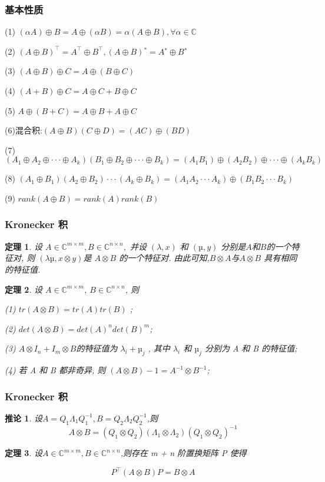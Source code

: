 \documentclass[notheorems,serif]{beamer}
\newcommand{\hei}[1]{{\HEI#1}}
\newtheorem{theorem}{\hei{定理}}
\newtheorem{corollary}{\hei{推论}}
\begin{document}
\begin{frame}
\frametitle{基本性质}
(1) $(αA) \oplus B = A \oplus (αB) = α(A \oplus B), ∀ α ∈ \mathbb{C}$

(2) $(A \oplus B)^{⊺} = A^{⊺} \oplus B^{⊺}, (A \oplus B)^{∗} = A^{∗} \oplus B^{∗}$

(3) $(A \oplus B) \oplus C = A \oplus (B \oplus C)$

(4) $(A + B) \oplus C = A \oplus C + B \oplus C$

(5) $A \oplus (B + C) = A \oplus B + A \oplus C$

(6)混合积:$ (A \oplus B)(C \oplus D) = (AC) \oplus (BD)$

(7) $(A_1 \oplus A_2 \oplus · · · \oplus A_k)(B_1 \oplus B_2 \oplus · · · \oplus B_k)
= (A_1B_1) \oplus (A_2B_2) \oplus · · · \oplus (A_kB_k)$

(8) $(A_1 \oplus B_1)(A_2 \oplus B_2)· · ·(A_k \oplus B_k)
= (A_1A_2 · · · A_k) \oplus (B_1B_2 · · · B_k)$

(9) $rank(A \oplus B) = rank(A)rank(B)$
\end{frame}

\begin{frame}
\frametitle{Kronecker 积}
\begin{theorem}
	设 $A ∈ \mathbb{C}^{m×m}, B ∈ \mathbb{C}^{n×n},$ 并设 $(λ, x)$ 和 $(µ, y)$ 分别是$ A $和$ B $的一个特征对, 则 $(λµ, x ⊗ y) $是 $A ⊗ B$ 的一个特征对. 由此可知,$ B ⊗ A $与$A ⊗ B$ 具有相同的特征值.	
\end{theorem}
\begin{theorem}
	设 $A ∈ \mathbb{C}^{m×m}$, $B ∈ \mathbb{C}^{n×n}$, 则
	
	(1) $tr(A ⊗ B) = tr(A)tr(B)$ ;
	
	(2) $det(A ⊗ B) = det(A)^n det(B)^m $;
	
	(3) $A ⊗ I_n + I_m ⊗ B $的特征值为 $λ_i + µ_j$ , 其中 $λ_i$ 和 $µ_j$ 分别为 A 和 B 的特征值;
	
	(4) 若 A 和 B 都非奇异, 则 $(A ⊗ B)−1 = A^{−1} ⊗ B^{−1}$;	
\end{theorem}
\end{frame}

\begin{frame}
\frametitle{Kronecker 积}
\begin{corollary}
	设$A=Q_{1} \Lambda_{1} Q_{1}^{-1}, B=Q_{2} \Lambda_{2} Q_{2}^{-1}$,则
	$$
	A \otimes B=\left(Q_{1} \otimes Q_{2}\right)\left(\Lambda_{1} \otimes \Lambda_{2}\right)\left(Q_{1} \otimes Q_{2}\right)^{-1}
	$$	
\end{corollary}

\begin{theorem}
	设$A \in \mathbb{C}^{m \times m}, B \in \mathbb{C}^{n \times n}$,则存在 m + n 阶置换矩阵 P 使得
	
	$$
	P^{\top}(A \otimes B) P=B \otimes A
	$$	
\end{theorem}
\end{frame}
\end{document}
